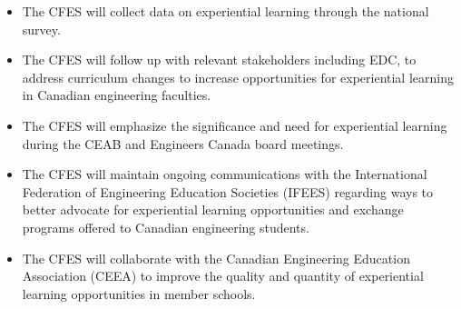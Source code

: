 \begin{itemize}
 \item The CFES will collect data on experiential learning through the national survey.
 \item The CFES will follow up with relevant stakeholders including EDC, to address curriculum changes to increase opportunities for experiential learning in Canadian engineering faculties.
 \item The CFES will emphasize the significance and need for experiential learning during the CEAB and Engineers Canada board meetings.
 \item The CFES will maintain ongoing communications with the International Federation of Engineering Education Societies (IFEES) regarding ways to better advocate for experiential learning opportunities and exchange programs offered to Canadian engineering students.
 \item The CFES will collaborate with the Canadian Engineering Education Association (CEEA) to improve the quality and quantity of experiential learning opportunities in member schools.
\end{itemize}

\newpage
